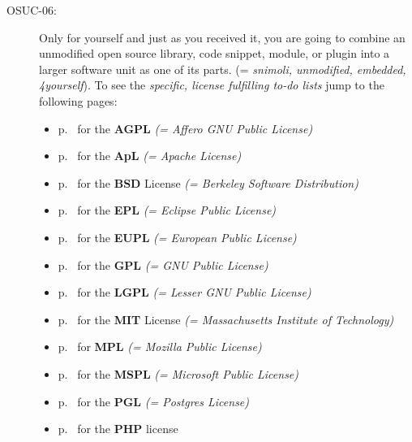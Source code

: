 \begin{description}
\item[OSUC-06:]\label{OSUC-06-DEF} Only for yourself and just as you received
it, you are going to combine an unmodified open source library, code snippet,
module, or plugin into a larger software unit as one of its parts. (=
\textit{snimoli, unmodified, embedded, 4yourself}).
To see the \textit{specific, license fulfilling to-do lists} jump to the
following pages:
   \begin{itemize}
    \item p.\ \pageref{OSUC-06-AGPL} for the \textbf{AGPL}
      \textit{(= Affero GNU Public License)} 
    \item p.\ \pageref{OSUC-06-Apache20} for the \textbf{ApL}
      \textit{(= Apache License)}
    \item p.\ \pageref{OSUC-06-BSD} for the \textbf{BSD} License
      \textit{(= Berkeley Software Distribution)}
    \item p.\ \pageref{OSUC-06-EPL} for the \textbf{EPL}
      \textit{(= Eclipse Public License)}     
    \item p.\ \pageref{OSUC-06-EUPL} for the \textbf{EUPL}
      \textit{(= European Public License)} 
    \item p.\ \pageref{OSUC-06-GPL} for the \textbf{GPL}
       \textit{(= GNU Public License)} 
    \item p.\ \pageref{OSUC-06-LGPL} for the \textbf{LGPL}
      \textit{(= Lesser GNU Public License)}           
    \item p.\ \pageref{OSUC-06-MIT} for the \textbf{MIT} License
       \textit{(= Massachusetts Institute of Technology)} 
    \item p.\ \pageref{OSUC-06-MPL} for \textbf{MPL}
      \textit{(= Mozilla Public License)}     
    \item p.\ \pageref{OSUC-06-MsPL} for the \textbf{MSPL}
      \textit{(= Microsoft Public License)} 
    \item p.\ \pageref{OSUC-06-PGL} for the \textbf{PGL}
      \textit{(= Postgres License)} 
    \item p.\ \pageref{OSUC-06-PHP} for the \textbf{PHP} license 
  \end{itemize}


\end{description}
